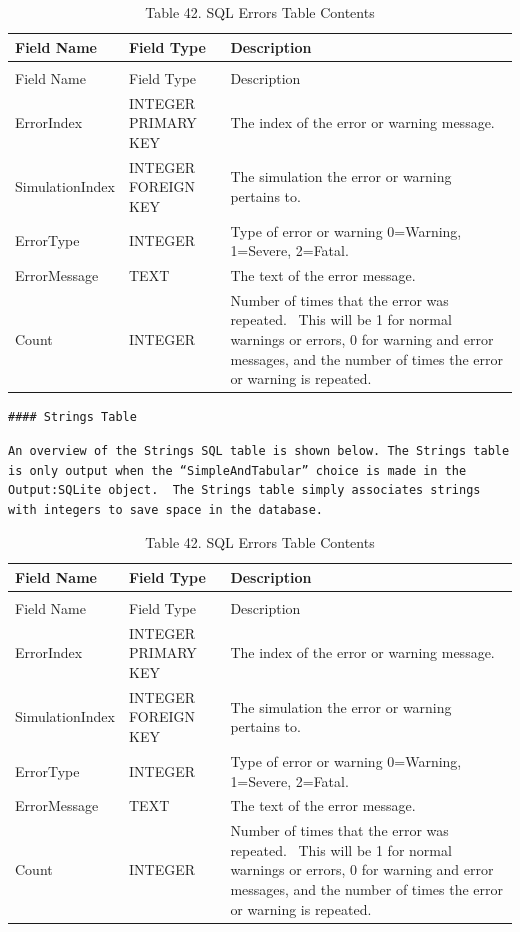 \begin{longtable}[c]{p{1.5in}p{1.5in}p{2.99in}}
\caption{Table 42. SQL Errors Table Contents \label{table:table-42.-sql-errors-table-contents}} \tabularnewline
\toprule 
Field Name & Field Type & Description \tabularnewline
\midrule
\endfirsthead

\caption[]{Table 42. SQL Errors Table Contents} \tabularnewline
\toprule 
Field Name & Field Type & Description \tabularnewline
\midrule
\endhead

ErrorIndex & INTEGER PRIMARY KEY & The index of the error or warning message. \tabularnewline
SimulationIndex & INTEGER FOREIGN KEY & The simulation the error or warning pertains to. \tabularnewline
ErrorType & INTEGER & Type of error or warning 0=Warning, 1=Severe, 2=Fatal. \tabularnewline
ErrorMessage & TEXT & The text of the error message. \tabularnewline
Count & INTEGER & Number of times that the error was repeated.~ This will be 1 for normal warnings or errors, 0 for warning and error messages, and the number of times the error or warning is repeated. \tabularnewline
\bottomrule
\end{longtable}

\begin{lstlisting}
#### Strings Table
\end{lstlisting}

\begin{lstlisting}
An overview of the Strings SQL table is shown below. The Strings table is only output when the “SimpleAndTabular” choice is made in the Output:SQLite object.  The Strings table simply associates strings with integers to save space in the database.
\end{lstlisting}

\begin{longtable}[c]{p{1.5in}p{1.5in}p{2.99in}}
\caption{Table 42. SQL Errors Table Contents \label{table:table-42.-sql-errors-table-contents}} \tabularnewline
\toprule 
Field Name & Field Type & Description \tabularnewline
\midrule
\endfirsthead

\caption[]{Table 42. SQL Errors Table Contents} \tabularnewline
\toprule 
Field Name & Field Type & Description \tabularnewline
\midrule
\endhead

ErrorIndex & INTEGER PRIMARY KEY & The index of the error or warning message. \tabularnewline
SimulationIndex & INTEGER FOREIGN KEY & The simulation the error or warning pertains to. \tabularnewline
ErrorType & INTEGER & Type of error or warning 0=Warning, 1=Severe, 2=Fatal. \tabularnewline
ErrorMessage & TEXT & The text of the error message. \tabularnewline
Count & INTEGER & Number of times that the error was repeated.~ This will be 1 for normal warnings or errors, 0 for warning and error messages, and the number of times the error or warning is repeated. \tabularnewline
\bottomrule
\end{longtable}

